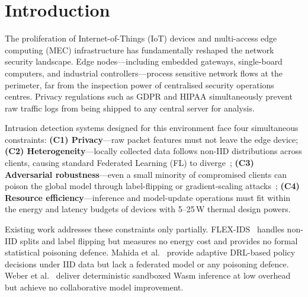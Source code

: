 \documentclass[iicol,sn-mathphys,Numbered]{sn-jnl}
\begin{document}

\maketitle

\section{Introduction}\label{sec:intro}

The proliferation of Internet-of-Things (IoT) devices and multi-access edge computing (MEC) infrastructure has fundamentally reshaped the network security landscape. Edge nodes---including embedded gateways, single-board computers, and industrial controllers---process sensitive network flows at the perimeter, far from the inspection power of centralised security operations centres. Privacy regulations such as GDPR and HIPAA simultaneously prevent raw traffic logs from being shipped to any central server for analysis.

Intrusion detection systems designed for this environment face four simultaneous constraints:
\textbf{(C1) Privacy}---raw packet features must not leave the edge device;
\textbf{(C2) Heterogeneity}---locally collected data follows non-IID distributions across clients, causing standard Federated Learning (FL) to diverge~\cite{li2020fedprox};
\textbf{(C3) Adversarial robustness}---even a small minority of compromised clients can poison the global model through label-flipping or gradient-scaling attacks~\cite{tolpegin2020};
\textbf{(C4) Resource efficiency}---inference and model-update operations must fit within the energy and latency budgets of devices with 5--25\,W thermal design powers.

Existing work addresses these constraints only partially. FLEX-IDS~\cite{flexids} handles non-IID splits and label flipping but measures no energy cost and provides no formal statistical poisoning defence. Mahida et al.~\cite{mahida2026} provide adaptive DRL-based policy decisions under IID data but lack a federated model or any poisoning defence. Weber et al.~\cite{weber2026} deliver deterministic sandboxed Wasm inference at low overhead but achieve no collaborative model improvement.
\end{document}
